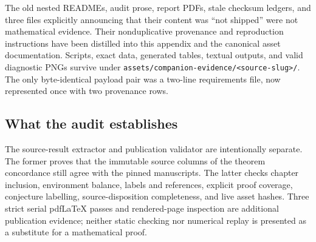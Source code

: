 The old nested READMEs, audit prose, report PDFs, stale checksum ledgers, and
three files explicitly announcing that their content was “not shipped” were
not mathematical evidence.  Their nonduplicative provenance and reproduction
instructions have been distilled into this appendix and the canonical asset
documentation.  Scripts, exact data, generated tables, textual outputs, and
valid diagnostic PNGs survive under
\nolinkurl{assets/companion-evidence/<source-slug>/}.  The only byte-identical
payload pair was a two-line requirements file, now represented once with two
provenance rows.

\subsection{What the audit establishes}

The source-result extractor and publication validator are intentionally
separate.  The former proves that the immutable source columns of the theorem
concordance still agree with the pinned manuscripts.  The latter checks
chapter inclusion, environment balance, labels and references, explicit proof
coverage, conjecture labelling, source-disposition completeness, and live asset
hashes.  Three strict serial pdfLaTeX passes and rendered-page inspection are
additional publication evidence; neither static checking nor numerical replay
is presented as a substitute for a mathematical proof.
